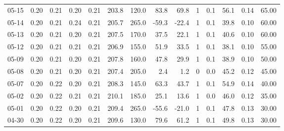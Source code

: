 \begin{threeparttable}
{\begin{tabular}{lrrrrrrrrrrrrr}
  05-15 &          0.20 &          0.21 &          0.20 &        0.21 &               203.8 &               120.0 &       83.8 &         69.8 &              1 &                 0.1 &             56.1 &            0.14 &                  65.00 \\
  05-14 &          0.20 &          0.21 &          0.24 &        0.21 &               205.7 &               265.0 &      -59.3 &        -22.4 &              1 &                 0.1 &             39.8 &            0.10 &                  60.00 \\
  05-13 &          0.20 &          0.21 &          0.20 &        0.21 &               207.5 &               170.0 &       37.5 &         22.1 &              1 &                 0.1 &             40.6 &            0.10 &                  60.00 \\
  05-12 &          0.20 &          0.21 &          0.21 &        0.21 &               206.9 &               155.0 &       51.9 &         33.5 &              1 &                 0.1 &             38.1 &            0.10 &                  55.00 \\
  05-09 &          0.20 &          0.21 &          0.20 &        0.21 &               207.8 &               160.0 &       47.8 &         29.9 &              1 &                 0.1 &             38.9 &            0.10 &                  50.00 \\
  05-08 &          0.20 &          0.21 &          0.20 &        0.21 &               207.4 &               205.0 &        2.4 &          1.2 &              0 &                 0.0 &             45.2 &            0.12 &                  45.00 \\
  05-07 &          0.20 &          0.22 &          0.20 &        0.21 &               208.3 &               145.0 &       63.3 &         43.7 &              1 &                 0.1 &             54.9 &            0.14 &                  40.00 \\
  05-02 &          0.20 &          0.22 &          0.21 &        0.21 &               210.1 &               185.0 &       25.1 &         13.6 &              1 &                 0.0 &             46.0 &            0.12 &                  35.00 \\
  05-01 &          0.20 &          0.22 &          0.20 &        0.21 &               209.4 &               265.0 &      -55.6 &        -21.0 &              1 &                 0.1 &             47.8 &            0.13 &                  30.00 \\
  04-30 &          0.20 &          0.22 &          0.20 &        0.21 &               209.6 &               130.0 &       79.6 &         61.2 &              1 &                 0.1 &             49.8 &            0.13 &                  30.00 \\

\end{tabular}}
\end{threeparttable}
